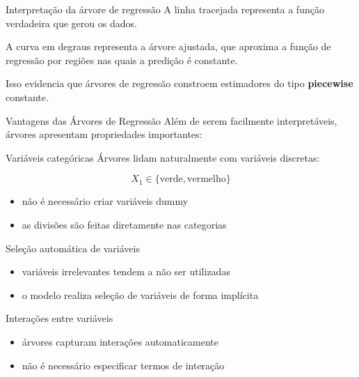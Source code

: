 \documentclass[
  ignorenonframetext,
  aspectratio=169,
]{beamer}
\providecommand{\tightlist}{%
  \setlength{\itemsep}{0pt}\setlength{\parskip}{0pt}}
\begin{document}
\begin{frame}
\begin{block}{Interpretação da árvore de regressão}
\label{interpretauxe7uxe3o-da-uxe1rvore-de-regressuxe3o}
A linha tracejada representa a função verdadeira que gerou os dados.

A curva em degraus representa a árvore ajustada, que aproxima a função
de regressão por regiões nas quais a predição é constante.

Isso evidencia que árvores de regressão constroem estimadores do tipo
\textbf{piecewise} constante.
\end{block}
\end{frame}

\begin{frame}
\begin{block}{Vantagens das Árvores de Regressão}
\label{vantagens-das-uxe1rvores-de-regressuxe3o}
Além de serem facilmente interpretáveis, árvores apresentam propriedades
importantes:

\begin{block}{Variáveis categóricas}
\label{variuxe1veis-categuxf3ricas}
Árvores lidam naturalmente com variáveis discretas:

\[
X_1 \in \{\text{verde}, \text{vermelho}\}
\]

\begin{itemize}
\tightlist
\item
  não é necessário criar variáveis dummy
\item
  as divisões são feitas diretamente nas categorias
\end{itemize}
\end{block}
\end{block}
\end{frame}

\begin{frame}
\begin{block}{Seleção automática de variáveis}
\label{seleuxe7uxe3o-automuxe1tica-de-variuxe1veis}
\begin{itemize}
\tightlist
\item
  variáveis irrelevantes tendem a não ser utilizadas\\
\item
  o modelo realiza seleção de variáveis de forma implícita
\end{itemize}
\end{block}

\begin{block}{Interações entre variáveis}
\label{interauxe7uxf5es-entre-variuxe1veis}
\begin{itemize}
\tightlist
\item
  árvores capturam interações automaticamente\\
\item
  não é necessário especificar termos de interação
\end{itemize}
\end{block}
\end{frame}
\end{document}
